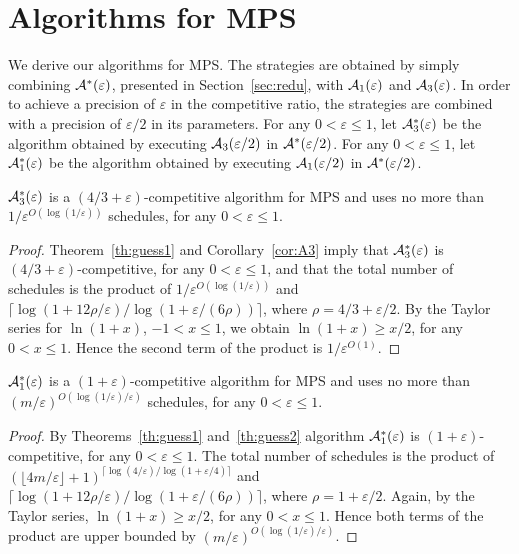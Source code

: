 \documentclass{llncs}
\newcommand{\MPS}{{\rm MPS}}
\newcommand{\eps}{\varepsilon}
\begin{document}
\section{Algorithms for \MPS}\label{sec:mps}

We derive our algorithms for \MPS. The strategies are obtained by simply combining ${\cal A^*}(\eps)$,
presented in Section~\ref{sec:redu}, with ${\cal A}_1(\eps)$ and ${\cal A}_3(\eps)$. 
In order to achieve a precision of $\eps$ in the competitive ratio, the strategies are combined with
a precision of $\eps/2$ in its parameters. 
For any $0< \eps \leq 1$, let ${\cal A}_3^*(\eps)$ be the algorithm obtained by executing
${\cal A}_3(\eps/2)$ in ${\cal A^*}(\eps/2)$. For any $0< \eps \leq 1$, 
let ${\cal A}_1^*(\eps)$ be the algorithm obtained by executing ${\cal A}_1(\eps/2)$ in ${\cal A^*}(\eps/2)$.

\begin{corollary}\label{cor:2}
${\cal A}_3^*(\eps)$ is a $(4/3+\eps)$-competitive algorithm for MPS and
uses no more than $1/\eps^{O(\log (1/\eps))}$ schedules, for any $0<\eps \leq 1$.
\end{corollary}
\begin{proof}
Theorem~\ref{th:guess1} and Corollary~\ref{cor:A3} imply that ${\cal A}_3^*(\eps)$ is
$(4/3+\eps)$-competitive, for any $0<\eps \leq 1$, and that the total number of schedules is the 
product of $1/\eps^{O(\log (1/\eps))}$ and $\lceil \log (1+ 12\rho/\eps) / \log(1+ \eps/(6\rho))\rceil$, 
where $\rho = 4/3+\eps/2$. By the Taylor series for $\ln(1+x)$, $-1< x \leq 1$, we obtain
$\ln(1+x) \geq x/2$, for any $0<x \leq 1$. Hence the second term of the product is $1/\eps^{O(1)}$. \hspace*{\fill}{$\Box$}
\end{proof}

\begin{corollary}\label{cor:3}
${\cal A}_1^*(\eps)$ is a $(1+\eps)$-competitive algorithm for MPS and uses no more than 
$(m/\eps)^{O(\log (1/\eps) / \eps)}$ schedules, for any $0<\eps \leq 1$.
\end{corollary}
\begin{proof}
By Theorems~\ref{th:guess1} and~\ref{th:guess2} algorithm ${\cal A}_1^*(\eps)$ is $(1+\eps)$-competitive,
for any $0<\eps \leq 1$. The total number of schedules is the product of 
$(\lfloor 4m/\eps\rfloor +1)^{\lceil \log(4/\eps) / \log(1+\eps/4) \rceil }$ and
$\lceil \log (1+ 12\rho/\eps) / \log(1+ \eps/(6\rho))\rceil$, where $\rho = 1 +\eps/2$. Again, by the 
Taylor series, $\ln(1+x) \geq x/2$, for any $0<x \leq 1$. Hence both terms of the product are upper bounded
by $(m/\eps)^{O(\log (1/\eps) / \eps)}$. \hspace*{\fill}{$\Box$}
\end{proof}
\end{document}
